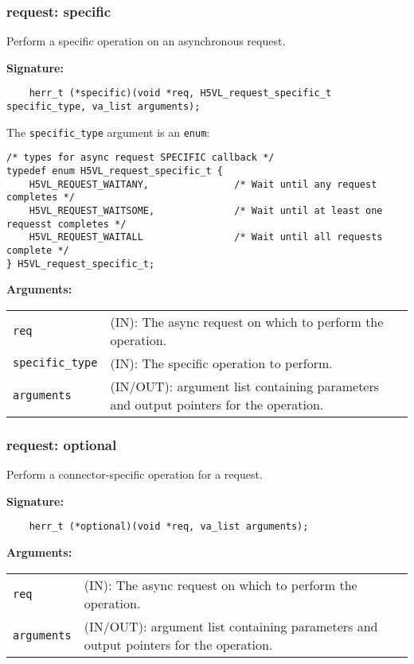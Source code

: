 \subsubsection{request: specific}
Perform a specific operation on an asynchronous request.

\begin{mdframed}[style=bgbox]
\textbf{Signature:}
\begin{lstlisting}
    herr_t (*specific)(void *req, H5VL_request_specific_t specific_type, va_list arguments);
\end{lstlisting}

The \texttt{specific\_type} argument is an \texttt{enum}:
\begin{lstlisting}
/* types for async request SPECIFIC callback */
typedef enum H5VL_request_specific_t {
    H5VL_REQUEST_WAITANY,               /* Wait until any request completes */   
    H5VL_REQUEST_WAITSOME,              /* Wait until at least one requesst completes */
    H5VL_REQUEST_WAITALL                /* Wait until all requests complete */   
} H5VL_request_specific_t; 
\end{lstlisting}

\textbf{Arguments:}\\
\begin{tabular}{l p{13.5cm}}
  \texttt{req} & (IN): The async request on which to perform the operation.\\
  \texttt{specific\_type} & (IN): The specific operation to perform.\\
  \texttt{arguments} & (IN/OUT): argument list containing parameters and output pointers for the operation. \\
\end{tabular}
\end{mdframed}

\subsubsection{request: optional}
Perform a connector-specific operation for a request.

\begin{mdframed}[style=bgbox]
\textbf{Signature:}
\begin{lstlisting}
    herr_t (*optional)(void *req, va_list arguments);                            
\end{lstlisting}

\textbf{Arguments:}\\
\begin{tabular}{l p{13.5cm}}
  \texttt{req} & (IN): The async request on which to perform the operation.\\
  \texttt{arguments} & (IN/OUT): argument list containing parameters and output pointers for the operation. \\
\end{tabular}
\end{mdframed}

